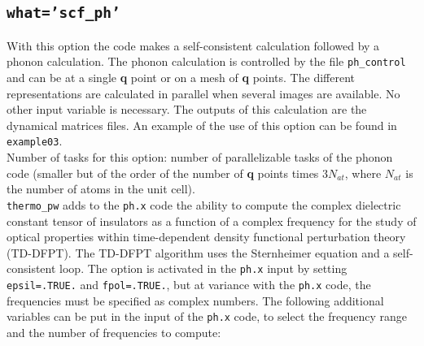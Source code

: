 \documentclass[12pt,a4paper]{article}
\begin{document}
\subsection{\color{web-blue}\texttt{what='scf\_ph'}}
With this option the code makes a self-consistent calculation followed
by a phonon calculation. The phonon calculation is controlled by the file
\texttt{ph\_control} and can be at a single {\bf q} point or on a mesh of 
{\bf q} points. 
The different representations are calculated in parallel when several images 
are available. No other input variable is necessary. The outputs of this 
calculation are the dynamical matrices files.
An example of the use of this option can be found in \texttt{example03}. \\
Number of tasks for this option: number of parallelizable tasks of the 
phonon code (smaller but of the order of the number of {\bf q} points times 
$3 N_{at}$, where $N_{at}$ is the number of atoms in the unit cell). \\
\texttt{thermo\_pw} adds to the \texttt{ph.x} code the ability to
compute the complex dielectric constant tensor of insulators as a function 
of a complex frequency for the study of optical properties within 
time-dependent density functional perturbation theory (TD-DFPT). 
The TD-DFPT algorithm uses the Sternheimer equation and a self-consistent loop.
The option is activated in the \texttt{ph.x} input by setting 
\texttt{epsil=.TRUE.} and \texttt{fpol=.TRUE.}, but at variance with
the \texttt{ph.x} code, the frequencies must be specified as complex numbers.
The following additional variables can be put in the input of the \texttt{ph.x}
code, to select the frequency range and the number of frequencies to compute:
\end{document}

